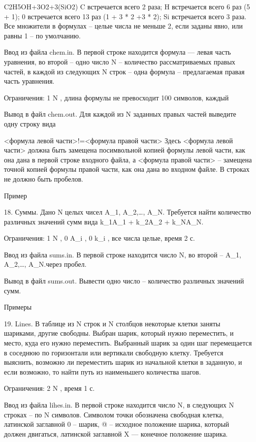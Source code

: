 \documentclass[]{article}
\begin{document}
C2H5OH+3O2+3(SiO2)
C встречается всего 2 раза;
H встречается всего 6 раз (5 + 1);
0 встречается всего 13 раз (1 + 3 * 2 +3 * 2);
Si встречается всего 3 раза.
Все множители в формулах – целые числа не меньше 2, если заданы явно, или равны 1 – по умолчанию.

Ввод из файла chem.in. В первой строке находится формула — левая часть уравнения, во второй – одно число N – количество рассматриваемых правых частей, в каждой из следующих N строк – одна формула – предлагаемая правая часть уравнения.

Ограничения: 1 \leq N , длина формулы не превосходит 100 символов, каждый

Вывод в файл chem.out. Для каждой из N заданных правых частей выведите одну строку вида

<формула левой части>!=<формула правой части>
Здесь <формула левой части> должна быть замещена посимвольной копией формулы левой части, как она дана в первой строке входного файла, а <формула правой части> – замещена точной копией формулы правой части, как она дана во входном файле. В строках не должно быть пробелов.

Пример



18. Суммы. Дано N целых чисел A_1, A_2,\ldots, A_N. Требуется найти количество различных значений сумм вида k_1A_1 + k_2A_2 + k_NA_N.

Ограничения: 1 \leq N , 0 \leq A_i , 0 \leq k_i , все числа целые, время 2 с.

Ввод из файла sums.in. В первой строке находится число N, во второй – A_1, A_2,\ldots, A_N.через пробел.

Вывод в файл sums.out. Вывести одно число – количество различных значений сумм.

Примеры



19. Lines. В таблице из N строк и N столбцов некоторые клетки заняты шариками, другие свободны. Выбран шарик, который нужно переместить, и место, куда его нужно переместить. Выбранный шарик за один шаг перемещается в соседнюю по горизонтали или вертикали свободную клетку. Требуется выяснить, возможно ли переместить шарик из начальной клетки в заданную, и если возможно, то найти путь из наименьшего количества шагов.

Ограничения: 2 \leq N , время 1 с.

Ввод из файла lihes.in. В первой строке находится число N, в следующих N строках – по N символов. Символом точки обозначена свободная клетка, латинской заглавной 0 – шарик, @ – исходное положение шарика, который должен двигаться, латинской заглавной X — конечное положение шарика.
\end{document}
